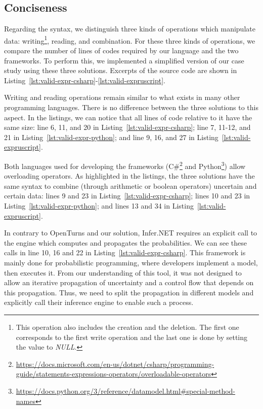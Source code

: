 \subsection{Conciseness}
Regarding the syntax, we distinguish three kinds of operations which manipulate data: writing\footnote{This operation also includes the creation and the deletion. 
The first one corresponds to the first write operation and the last one is done by setting the value to \textit{NULL}.}, reading, and combination. 
For these three kinds of operations, we compare the number of lines of codes required by our language and the two frameworks.
To perform this, we implemented a simplified version of our case study using these three solutions.
Excerpts of the source code are shown in Listing~\ref{lst:valid-expr-csharp}-\ref{lst:valid-expruscript}.

Writing and reading operations remain similar to what exists in many other programming languages.
There is no difference between the three solutions to this aspect.
In the listings, we can notice that all lines of code relative to it have the same size: line 6, 11, and 20 in Listing~\ref{lst:valid-expr-csharp}; line 7, 11-12, and 21 in Listing~\ref{lst:valid-expr-python}; and line 9, 16, and 27 in Listing~\ref{lst:valid-expruscript}.

Both languages used for developing the frameworks (C\#\footnote{\url{https://docs.microsoft.com/en-us/dotnet/csharp/programming-guide/statements-expressions-operators/overloadable-operators}} and Python\footnote{\url{https://docs.python.org/3/reference/datamodel.html\#special-method-names}}) allow overloading operators.
As highlighted in the listings, the three solutions have the same syntax to combine (through arithmetic or boolean operators) uncertain and certain data: lines 9 and 23 in Listing~\ref{lst:valid-expr-csharp}; lines 10 and 23 in Listing~\ref{lst:valid-expr-python}; and lines 13 and 34 in Listing~\ref{lst:valid-expruscript}.

In contrary to OpenTurns and our solution, Infer.NET requires an explicit call to the engine which computes and propagates the probabilities.
We can see these calls in line 10, 16 and 22 in Listing~\ref{lst:valid-expr-csharp}.
This framework is mainly done for probabilistic programming, where developers implement a model, then executes it.
From our understanding of this tool, it was not designed to allow an iterative propagation of uncertainty and a control flow that depends on this propagation.
Thus, we need to split the propagation in different models and explicitly call their inference engine to enable such a process.

